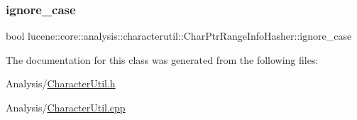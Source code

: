 \subsubsection{\texorpdfstring{ignore\+\_\+case}{ignore\_case}}
{\footnotesize\ttfamily bool lucene\+::core\+::analysis\+::characterutil\+::\+Char\+Ptr\+Range\+Info\+Hasher\+::ignore\+\_\+case\hspace{0.3cm}{\ttfamily [private]}}



The documentation for this class was generated from the following files\+:\begin{DoxyCompactItemize}
\item 
Analysis/\mbox{\hyperlink{CharacterUtil_8h}{Character\+Util.\+h}}\item 
Analysis/\mbox{\hyperlink{CharacterUtil_8cpp}{Character\+Util.\+cpp}}\end{DoxyCompactItemize}
